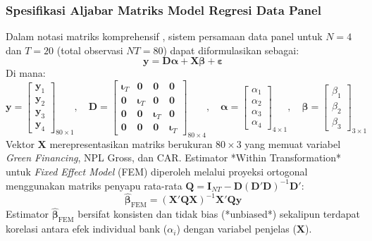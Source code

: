 \documentclass[12pt,a4paper]{article}
\numberwithin{equation}{section}
\begin{document}
\subsubsection{Spesifikasi Aljabar Matriks Model Regresi Data Panel}
\noindent
Dalam notasi matriks komprehensif \citep{Greene2018, Wooldridge2020}, sistem persamaan data panel untuk $N = 4$ dan $T = 20$ (total observasi $NT = 80$) dapat diformulasikan sebagai:
\begin{equation}
  \mathbf{y} = \mathbf{D}\boldsymbol{\alpha} + \mathbf{X}\boldsymbol{\beta} + \boldsymbol{\varepsilon}
\end{equation}
Di mana:
\begin{equation}
  \mathbf{y} = \begin{bmatrix} \mathbf{y}_1 \\ \mathbf{y}_2 \\ \mathbf{y}_3 \\ \mathbf{y}_4 \end{bmatrix}_{80 \times 1}, \quad
  \mathbf{D} = \begin{bmatrix} \boldsymbol{\iota}_T & \mathbf{0} & \mathbf{0} & \mathbf{0} \\ \mathbf{0} & \boldsymbol{\iota}_T & \mathbf{0} & \mathbf{0} \\ \mathbf{0} & \mathbf{0} & \boldsymbol{\iota}_T & \mathbf{0} \\ \mathbf{0} & \mathbf{0} & \mathbf{0} & \boldsymbol{\iota}_T \end{bmatrix}_{80 \times 4}, \quad
  \boldsymbol{\alpha} = \begin{bmatrix} \alpha_1 \\ \alpha_2 \\ \alpha_3 \\ \alpha_4 \end{bmatrix}_{4 \times 1}, \quad
  \boldsymbol{\beta} = \begin{bmatrix} \beta_1 \\ \beta_2 \\ \beta_3 \end{bmatrix}_{3 \times 1}
\end{equation}
Vektor $\mathbf{X}$ merepresentasikan matriks berukuran $80 \times 3$ yang memuat variabel \emph{Green Financing}, NPL Gross, dan CAR. Estimator *Within Transformation* untuk \emph{Fixed Effect Model} (FEM) diperoleh melalui proyeksi ortogonal menggunakan matriks penyapu rata-rata $\mathbf{Q} = \mathbf{I}_{NT} - \mathbf{D}(\mathbf{D}'\mathbf{D})^{-1}\mathbf{D}'$:
\begin{equation}
  \hat{\boldsymbol{\beta}}_{\text{FEM}} = (\mathbf{X}'\mathbf{Q}\mathbf{X})^{-1} \mathbf{X}'\mathbf{Q}\mathbf{y}
\end{equation}
Estimator $\hat{\boldsymbol{\beta}}_{\text{FEM}}$ bersifat konsisten dan tidak bias (*unbiased*) sekalipun terdapat korelasi antara efek individual bank ($\alpha_i$) dengan variabel penjelas ($\mathbf{X}$).
\end{document}

